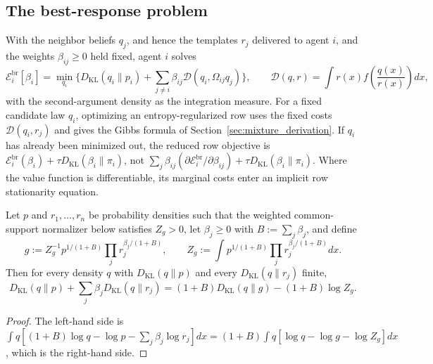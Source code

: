 \subsection*{The best-response problem}

With the neighbor beliefs $q_j$, and hence the templates $r_j$ delivered to agent $i$, and the weights $\beta_{ij} \geq 0$ held fixed, agent $i$ solves
\begin{equation}
\mathcal E_i^{\mathrm{br}}[\beta_i]
=\min_{q_i}
\Big\{
D_{\mathrm{KL}}(q_i \| p_i)
+ \sum_{j\neq i} \beta_{ij}\mathcal{D}(q_i,\Omega_{ij}q_j)
\Big\},
\qquad
\mathcal{D}(q, r) = \int r(x) f\left(\frac{q(x)}{r(x)}\right)dx,
\label{eq:F_i_app}
\end{equation}
with the second-argument density as the integration measure. For a fixed candidate law $q_i$, optimizing an entropy-regularized row uses the fixed costs $\mathcal D(q_i,r_j)$ and gives the Gibbs formula of Section~\ref{sec:mixture_derivation}. If $q_i$ has already been minimized out, the reduced row objective is $\mathcal E_i^{\mathrm{br}}(\beta_i)+\tau D_{\mathrm{KL}}(\beta_i\|\pi_i)$, not $\sum_j\beta_{ij}(\partial \mathcal E_i^{\mathrm{br}}/\partial\beta_{ij})+\tau D_{\mathrm{KL}}(\beta_i\|\pi_i)$. Where the value function is differentiable, its marginal costs enter an implicit row stationarity equation.

\begin{lemma}
\label{lem:kl_sum_identity}
Let $p$ and $r_1, \dots, r_n$ be probability densities such that the weighted common-support normalizer below satisfies $Z_g>0$, let $\beta_j \geq 0$ with $B := \sum_j\beta_j$, and define
\begin{equation}
g := Z_g^{-1}p^{1/(1+B)}\prod_j r_j^{\beta_j/(1+B)},
\qquad
Z_g := \int p^{1/(1+B)}\prod_j r_j^{\beta_j/(1+B)}dx.
\end{equation}
Then for every density $q$ with $D_{\mathrm{KL}}(q\|p)$ and every $D_{\mathrm{KL}}(q\|r_j)$ finite,
\begin{equation}
D_{\mathrm{KL}}(q\|p) + \sum_j\beta_jD_{\mathrm{KL}}(q\|r_j) = (1+B)D_{\mathrm{KL}}(q\|g) - (1+B)\log Z_g.
\label{eq:kl_sum_identity}
\end{equation}
\end{lemma}

\begin{proof}
The left-hand side is $\int q[(1+B)\log q - \log p - \sum_j\beta_j\log r_j]dx = (1+B)\int q[\log q - \log g - \log Z_g]dx$, which is the right-hand side.
\end{proof}

